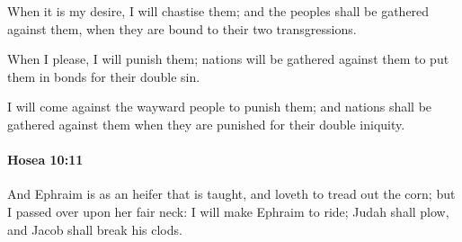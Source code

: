 			\begin{versebox}
					\item[BHS] 
					\item[LXX] 
					\item[ASV] When it is my desire, I will chastise them; and the peoples shall be gathered against them, when they are bound to their two transgressions.
					\item[NIV] When I please, I will punish them; nations will be gathered against them to put them in bonds for their double sin.
					\item[NRSV] I will come against the wayward people to punish them; and nations shall be gathered against them when they are punished for their double iniquity.
			\end{versebox}

		\paragraph{Hosea 10:11} %
			\label{HOSEA-10-11}

			And Ephraim is as an heifer that is taught, and loveth to tread out the corn; but I passed over upon her fair neck: I will make Ephraim to ride; Judah shall plow, and Jacob shall break his clods.

